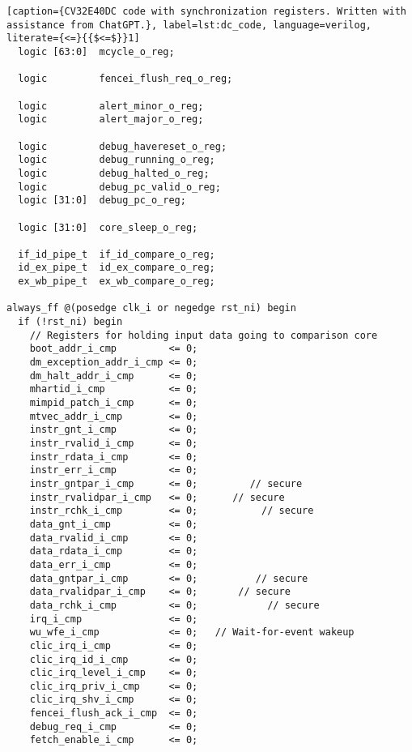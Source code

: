 \begin{lstlisting}[caption={CV32E40DC code with synchronization registers. Written with assistance from ChatGPT.}, label=lst:dc_code, language=verilog, literate={<=}{{$<=$}}1]
  logic [63:0]  mcycle_o_reg;  

  logic         fencei_flush_req_o_reg;  

  logic         alert_minor_o_reg;       
  logic         alert_major_o_reg;

  logic         debug_havereset_o_reg;   
  logic         debug_running_o_reg;     
  logic         debug_halted_o_reg;      
  logic         debug_pc_valid_o_reg;    
  logic [31:0]  debug_pc_o_reg;       

  logic [31:0]  core_sleep_o_reg;   

  if_id_pipe_t  if_id_compare_o_reg;     
  id_ex_pipe_t  id_ex_compare_o_reg;    
  ex_wb_pipe_t  ex_wb_compare_o_reg;     

always_ff @(posedge clk_i or negedge rst_ni) begin
  if (!rst_ni) begin 
    // Registers for holding input data going to comparison core
    boot_addr_i_cmp         <= 0;
    dm_exception_addr_i_cmp <= 0;
    dm_halt_addr_i_cmp      <= 0;
    mhartid_i_cmp           <= 0;
    mimpid_patch_i_cmp      <= 0;
    mtvec_addr_i_cmp        <= 0;
    instr_gnt_i_cmp         <= 0;
    instr_rvalid_i_cmp      <= 0;
    instr_rdata_i_cmp       <= 0;
    instr_err_i_cmp         <= 0;
    instr_gntpar_i_cmp      <= 0;         // secure
    instr_rvalidpar_i_cmp   <= 0;      // secure
    instr_rchk_i_cmp        <= 0;           // secure
    data_gnt_i_cmp          <= 0;
    data_rvalid_i_cmp       <= 0;
    data_rdata_i_cmp        <= 0;
    data_err_i_cmp          <= 0;
    data_gntpar_i_cmp       <= 0;          // secure
    data_rvalidpar_i_cmp    <= 0;       // secure
    data_rchk_i_cmp         <= 0;            // secure
    irq_i_cmp               <= 0;
    wu_wfe_i_cmp            <= 0;   // Wait-for-event wakeup
    clic_irq_i_cmp          <= 0;
    clic_irq_id_i_cmp       <= 0;
    clic_irq_level_i_cmp    <= 0; 
    clic_irq_priv_i_cmp     <= 0;
    clic_irq_shv_i_cmp      <= 0;
    fencei_flush_ack_i_cmp  <= 0;
    debug_req_i_cmp         <= 0;
    fetch_enable_i_cmp      <= 0;


\end{lstlisting}
